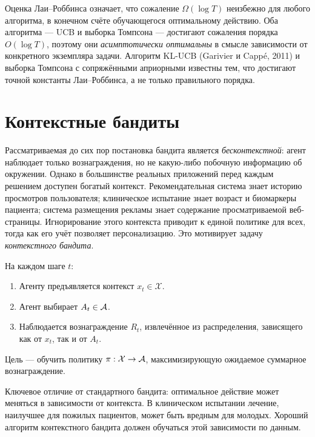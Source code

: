\begin{remark}
Оценка Лаи--Роббинса означает, что сожаление $\Omega(\log T)$ неизбежно для любого алгоритма, в конечном счёте обучающегося оптимальному действию.  Оба алгоритма — UCB и выборка Томпсона — достигают сожаления порядка $O(\log T)$, поэтому они \emph{асимптотически оптимальны} в смысле зависимости от конкретного экземпляра задачи.  Алгоритм KL-UCB (Garivier и Capp\'{e}, 2011) и выборка Томпсона с сопряжёнными априорными известны тем, что достигают точной константы Лаи--Роббинса, а не только правильного порядка.
\end{remark}


\section{Контекстные бандиты}
\label{sec:contextual}

Рассматриваемая до сих пор постановка бандита является \emph{бесконтекстной}: агент наблюдает только вознаграждения, но не какую-либо побочную информацию об окружении.  Однако в большинстве реальных приложений перед каждым решением доступен богатый контекст.  Рекомендательная система знает историю просмотров пользователя; клиническое испытание знает возраст и биомаркеры пациента; система размещения рекламы знает содержание просматриваемой веб-страницы.  Игнорирование этого контекста приводит к единой политике для всех, тогда как его учёт позволяет персонализацию.  Это мотивирует задачу \emph{контекстного бандита}.

\begin{definition}
\label{def:contextual-bandit}
На каждом шаге $t$:
\begin{enumerate}
\item Агенту предъявляется контекст $x_t\in\mathcal{X}$.
\item Агент выбирает $A_t\in\mathcal{A}$.
\item Наблюдается вознаграждение $R_t$, извлечённое из распределения, зависящего как от $x_t$, так и от $A_t$.
\end{enumerate}
Цель — обучить политику $\pi:\mathcal{X}\to\mathcal{A}$, максимизирующую ожидаемое суммарное вознаграждение.
\end{definition}

Ключевое отличие от стандартного бандита: оптимальное действие может меняться в зависимости от контекста.  В клиническом испытании лечение, наилучшее для пожилых пациентов, может быть вредным для молодых.  Хороший алгоритм контекстного бандита должен обучаться этой зависимости по данным.

